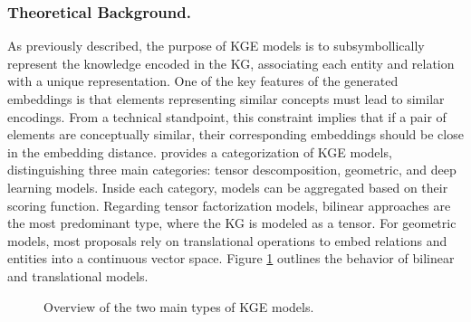 \subsubsection{Theoretical Background.} \label{subsec:s4_theoretical_back}
As previously described, the purpose of KGE models is to subsymbollically represent the knowledge encoded in the KG, associating each entity and relation with a unique representation. One of the key features of the generated embeddings is that elements representing similar concepts must lead to similar encodings. From a technical standpoint, this constraint implies that if a pair of elements are conceptually similar, their corresponding embeddings should be close in the embedding distance. \cite{rossi_knowledge_2021} provides a categorization of KGE models, distinguishing three main categories: tensor descomposition, geometric, and deep learning models. Inside each category, models can be aggregated based on their scoring function. Regarding tensor factorization models, bilinear approaches are the most predominant type, where the KG is modeled as a tensor. For geometric models, most proposals rely on translational operations to embed relations and entities into a continuous vector space. Figure \ref{fig:embedding_models} outlines the behavior of bilinear and translational models.  

\begin{figure}[t!]
    \centering
    \qquad
    \caption{Overview of the two main types of KGE models.}
    \label{fig:embedding_models}
\end{figure}

